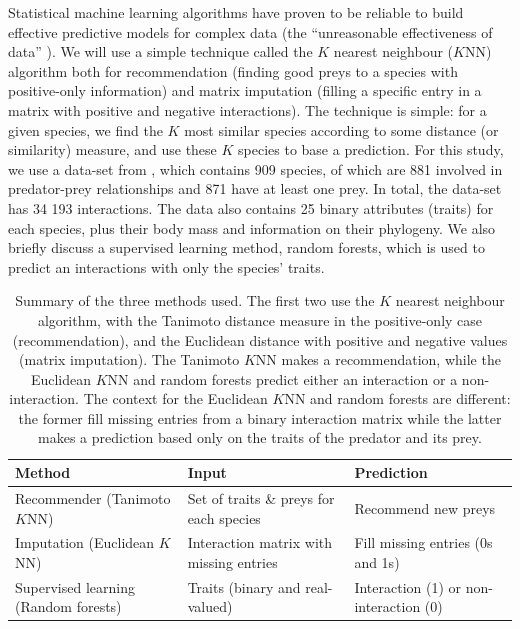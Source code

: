 \documentclass[letterpaper]{article}
\begin{document}
Statistical machine learning algorithms \cite{mur12} have proven to be reliable to
build effective predictive models for complex data (the ``unreasonable
effectiveness of data'' \cite{hal09}). We will use a simple technique called
the $K$ nearest neighbour ($K$NN) algorithm both for recommendation (finding
good preys to a species with positive-only information) and matrix imputation
(filling a specific entry in a matrix with positive and negative interactions).
The technique is simple: for a given species, we find the $K$ most similar
species according to some distance (or similarity) measure, and use these $K$
species to base a prediction. For this study, we use a data-set from
\cite{dig14}, which contains 909 species, of which are 881 involved in
predator-prey relationships and 871 have at least one prey. In total, the
data-set has 34 193 interactions. The data also contains 25 binary attributes (traits)
for each species, plus their body mass and information on their phylogeny.
We also briefly discuss a supervised learning method, random forests, which is
used to predict an interactions with only the species' traits.

\begin{table}
  \centering
  \begin{tabular}{|lll|}
    \hline
    Method                                 & Input                                    & Prediction \\
    \hline
    \hline
    Recommender (Tanimoto $K$NN)           & Set of traits \& preys for each species  & Recommend new preys\\
    Imputation (Euclidean $K$NN)           & Interaction matrix with missing entries  & Fill missing entries (0s and 1s)\\
    Supervised learning (Random forests)   & Traits (binary and real-valued)          & Interaction (1) or non-interaction (0)\\
    \hline
  \end{tabular}

  \caption{Summary of the three methods used. The first two use the $K$ nearest
  neighbour algorithm, with the Tanimoto distance measure in the positive-only
  case (recommendation), and the Euclidean distance with positive and negative
  values (matrix imputation). The Tanimoto $K$NN makes a recommendation, while
  the Euclidean $K$NN and random forests predict either an interaction or
  a non-interaction. The context for the Euclidean $K$NN and random forests are
  different: the former fill missing entries from a binary interaction matrix
  while the latter makes a prediction based only on the traits of the predator
  and its prey.}

  \label{table:methods_summary}
\end{table}
\end{document}
